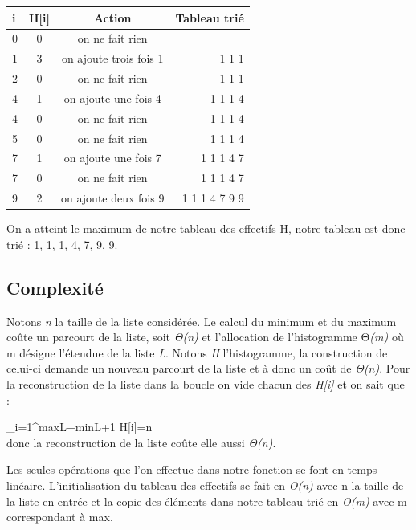 \documentclass[11pt]{article}
\begin{document}
\vspace{0.5 cm}
\hspace{3.0 cm}
\begin{tabular}{|l|c|c|r|}
  \hline
  i & H[i]  & Action & Tableau trié \\
  \hline
  0 &	0 &	on ne fait rien &\\
  1 &	3 &	on ajoute trois fois 1 &	1 1 1\\
  2 &	0 &	on ne fait rien &	1 1 1\\
  4 &	1 &	on ajoute une fois 4&	1 1 1 4\\
  4 &	0& 	on ne fait rien &	1 1 1 4\\
5 &	0 &	on ne fait rien &	1 1 1 4\\
7 &	1 &	on ajoute une fois 7 &	1 1 1 4 7\\
7 &	0 &	on ne fait rien  &	1 1 1 4 7\\
9 &	2& 	on ajoute deux fois 9 &	1 1 1 4 7 9 9\\
  \hline
\end{tabular}


\vspace{1.0 cm}
On a atteint le maximum de notre tableau des effectifs H, notre tableau est donc trié : 1, 1, 1, 4, 7, 9, 9.




\newpage 
\subsection{Complexité}



\hspace{1.0 cm}  Notons \textit{n} la taille de la liste considérée. Le calcul du minimum et du maximum coûte un parcourt de la liste, soit \textit{Θ(n) }et l'allocation de l'histogramme Θ\textit{(m)} où m désigne l'étendue de la liste \textit{L}. Notons \textit{H} l'histogramme, la construction de celui-ci demande un nouveau parcourt de la liste et à donc un coût de \textit{Θ(n)}. Pour la reconstruction de la liste dans la boucle on vide chacun des \textit{H[i]} et on sait que : 


\hspace{6.0 cm}\large\sum\limits_{i=1}^{maxL−minL+1}  H[i]=n \\


\normalsize donc la reconstruction de la liste coûte elle aussi \textit{Θ(n)}.


\normalsize Les seules opérations que l'on effectue dans notre fonction se font en temps linéaire. L'initialisation du tableau des effectifs se fait en \textit{O(n)} avec n la taille de la liste en entrée et la copie des éléments dans notre tableau trié en \textit{O(m)} avec m correspondant à max.
\end{document}
